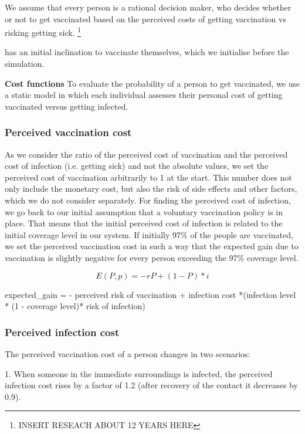 \documentclass[11pt]{article}
\begin{document}
We assume that every person is a rational decision maker, who decides whether or not to get vaccinated based on the perceived costs of getting vaccination vs risking getting sick.  \footnote{INSERT RESEACH ABOUT 12 YEARS HERE}  

has an initial inclination to vaccinate themselves, which we initialise before the simulation. 


\textbf{Cost functions}
To evaluate the probability of a person to get vaccinated, we use a static model in which each individual assesses their personal cost of getting vaccinated versus getting infected. 


\subsubsection{Perceived vaccination cost} 
As we consider the ratio of the perceived cost of vaccination and the perceived cost of infection (i.e. getting sick) and not the absolute values, we set the perceived cost of vaccination arbitrarily to 1 at the start. This number does not only include the monetary cost, but also the risk of side effects and other factors, which we do not consider separately. For finding the perceived cost of infection, we go back to our initial assumption that a voluntary vaccination policy is in place. That means that the initial perceived cost of infection is related to the initial coverage level in our system. If initially 97\% of the people are vaccinated, we set the perceived vaccination cost in such a way that the expected gain due to vaccination is slightly negative for every person exceeding the 97\% coverage level.

\begin{equation}
E(P,p) = -rP +(1-P)*i
\end{equation}


expected\_gain = - perceived risk of vaccination + infection cost *(infection level * (1 - coverage level)* risk of infection) 

\vspace{14px}


\subsubsection{Perceived infection cost}
The perceived vaccination cost of a person changes in two scenarios:

1. When someone in the immediate surroundings is infected, the perceived infection cost rises by a factor of 1.2 (after recovery of the contact it decreases by 0.9).
\end{document}
